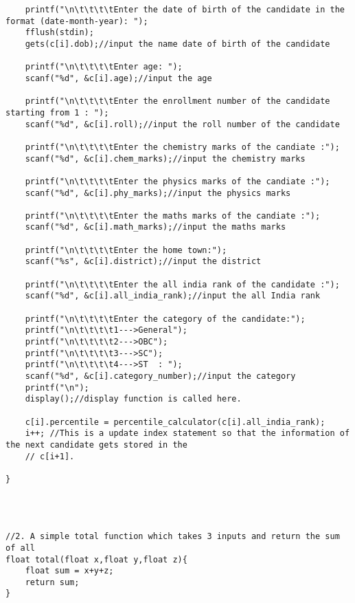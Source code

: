 \documentclass{article}
\begin{document}
\begin{FlushLeft}
\begin{verbatim}
    printf("\n\t\t\t\tEnter the date of birth of the candidate in the format (date-month-year): ");
    fflush(stdin);
    gets(c[i].dob);//input the name date of birth of the candidate

    printf("\n\t\t\t\tEnter age: ");
    scanf("%d", &c[i].age);//input the age

    printf("\n\t\t\t\tEnter the enrollment number of the candidate starting from 1 : ");
    scanf("%d", &c[i].roll);//input the roll number of the candidate

    printf("\n\t\t\t\tEnter the chemistry marks of the candiate :");
    scanf("%d", &c[i].chem_marks);//input the chemistry marks

    printf("\n\t\t\t\tEnter the physics marks of the candiate :");
    scanf("%d", &c[i].phy_marks);//input the physics marks

    printf("\n\t\t\t\tEnter the maths marks of the candiate :");
    scanf("%d", &c[i].math_marks);//input the maths marks

    printf("\n\t\t\t\tEnter the home town:");
    scanf("%s", &c[i].district);//input the district

    printf("\n\t\t\t\tEnter the all india rank of the candidate :");
    scanf("%d", &c[i].all_india_rank);//input the all India rank
    
    printf("\n\t\t\t\tEnter the category of the candidate:");
    printf("\n\t\t\t\t1--->General");
    printf("\n\t\t\t\t2--->OBC");
    printf("\n\t\t\t\t3--->SC");
    printf("\n\t\t\t\t4--->ST  : ");
    scanf("%d", &c[i].category_number);//input the category                              
    printf("\n");
    display();//display function is called here.

    c[i].percentile = percentile_calculator(c[i].all_india_rank);
    i++; //This is a update index statement so that the information of the next candidate gets stored in the 
    // c[i+1].

}




//2. A simple total function which takes 3 inputs and return the sum of all
float total(float x,float y,float z){
    float sum = x+y+z;
    return sum;
}





\end{verbatim}
\end{FlushLeft}
\end{document}
